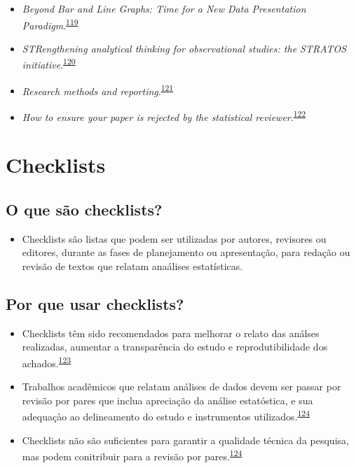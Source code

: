 \documentclass[
]{book}
\providecommand{\tightlist}{%
  \setlength{\itemsep}{0pt}\setlength{\parskip}{0pt}}
\begin{document}
\begin{itemize}
\item
  \emph{Beyond Bar and Line Graphs: Time for a New Data Presentation Paradigm}.\textsuperscript{\protect\hyperlink{ref-Weissgerber2015}{119}}
\item
  \emph{STRengthening analytical thinking for observational studies: the STRATOS initiative}.\textsuperscript{\protect\hyperlink{ref-Sauerbrei2014}{120}}
\item
  \emph{Research methods and reporting}.\textsuperscript{\protect\hyperlink{ref-groves2008}{121}}
\item
  \emph{How to ensure your paper is rejected by the statistical reviewer}.\textsuperscript{\protect\hyperlink{ref-stratton2005}{122}}
\end{itemize}

\hypertarget{checklists}{%
\section{Checklists}\label{checklists}}

\hypertarget{o-que-suxe3o-checklists}{%
\subsection{O que são checklists?}\label{o-que-suxe3o-checklists}}

\begin{itemize}
\tightlist
\item
  Checklists são listas que podem ser utilizadas por autores, revisores ou editores, durante as fases de planejamento ou apresentação, para redação ou revisão de textos que relatam anaálises estatísticas.
\end{itemize}

\hypertarget{por-que-usar-checklists}{%
\subsection{Por que usar checklists?}\label{por-que-usar-checklists}}

\begin{itemize}
\item
  Checklists têm sido recomendados para melhorar o relato das análses realizadas, aumentar a transparência do estudo e reprodutibilidade dos achados.\textsuperscript{\protect\hyperlink{ref-Gardner1986}{123}}
\item
  Trabalhos acadêmicos que relatam análises de dados devem ser passar por revisão por pares que inclua apreciação da análise estatóstica, e sua adequaçào ao delineamento do estudo e instrumentos utilizados.\textsuperscript{\protect\hyperlink{ref-Mascha2017}{124}}
\item
  Checklists não são suficientes para garantir a qualidade técnica da pesquisa, mas podem conitribuir para a revisão por pares.\textsuperscript{\protect\hyperlink{ref-Mascha2017}{124}}
\end{itemize}
\end{document}
